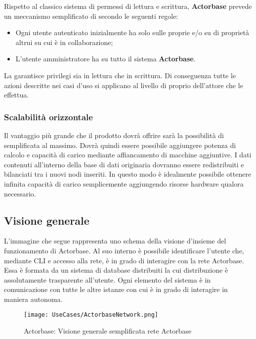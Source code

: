 \documentclass{scalatekids-article}
\begin{document}
Rispetto al classico sistema di permessi di lettura e scrittura, \textbf{Actorbase}
prevede un meccanismo semplificato di  secondo le seguenti regole:
\begin{itemize}
\item Ogni utente autenticato inizialmente ha  solo sulle proprie  e/o su  di proprietà altrui su cui è in collaborazione;
\item L'utente amministratore ha  su tutto il sistema \textbf{Actorbase}.
\end{itemize}
La  garantisce privilegi sia in lettura che in scrittura. Di
conseguenza tutte le azioni descritte nei casi d'uso si applicano al livello di
 proprio dell'attore che le effettua.

\subsubsection{Scalabilità orizzontale}

Il vantaggio più grande che il prodotto dovrà offrire sarà la possibilità di
 semplificata al massimo. Dovrà quindi essere possibile
aggiungere potenza di calcolo e capacità di carico mediante affiancamento di
macchine aggiuntive. I dati contenuti all'interno della base di dati originaria
dovranno essere redistribuiti e bilanciati tra i nuovi nodi inseriti. In questo
modo è idealmente possibile ottenere infinita capacità di carico semplicemente
aggiungendo risorse hardware qualora necessario.

\subsection{Visione generale}

L'immagine che segue rappresenta uno schema della visione d'insieme del funzionamento di Actorbase. Al suo interno è possibile identificare
l'utente che, mediante CLI e accesso alla rete, è in grado di interagire con la rete Actorbase. Essa è formata da un sistema di database distribuiti la cui distribuzione è assolutamente trasparente all'utente. Ogni elemento del sistema è in comunicazione con tutte le altre istanze con cui è in grado di interagire in maniera autonoma.
\begin{figure}[H]
  \begin{center}
    \texttt{[image: UseCases/ActorbaseNetwork.png]}
    \caption*{Actorbase: Visione generale semplificata rete Actorbase}
  \end{center}
\end{figure}
\end{document}
